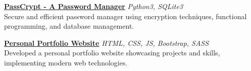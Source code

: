 \documentclass[a4paper]{article}
\begin{document}
\href{https://github.com/aaromalonline/PassCrypt}{\textbf{PassCrypt - A Password Manager}} {\sl Python3, SQLite3} \\
Secure and efficient password manager using encryption techniques, functional programming, and database management.\\
\vspace*{2mm}

\href{https://aaromalonline.github.io/}{\textbf{Personal Portfolio Website}} {\sl HTML, CSS, JS, Bootstrap, SASS} \\
Developed a personal portfolio website showcasing projects and skills, implementing modern web technologies.\\
\vspace*{2mm}
\end{document}

